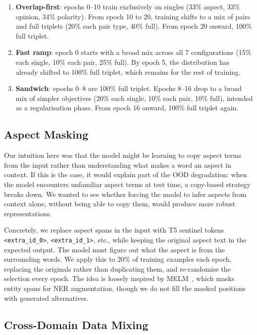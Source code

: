 \documentclass[12pt,a4paper]{report}
\begin{document}
\begin{enumerate}
    \item \textbf{Overlap-first}: epochs 0--10 train exclusively on singles (33\% aspect, 33\% opinion, 34\% polarity). From epoch 10 to 20, training shifts to a mix of pairs and full triplets (20\% each pair type, 40\% full). From epoch 20 onward, 100\% full triplet.
    \item \textbf{Fast ramp}: epoch 0 starts with a broad mix across all 7 configurations (15\% each single, 10\% each pair, 25\% full). By epoch 5, the distribution has already shifted to 100\% full triplet, which remains for the rest of training.
    \item \textbf{Sandwich}: epochs 0--8 are 100\% full triplet. Epochs 8--16 drop to a broad mix of simpler objectives (20\% each single, 10\% each pair, 10\% full), intended as a regularisation phase. From epoch 16 onward, 100\% full triplet again.
\end{enumerate}

\subsection{Aspect Masking}

Our intuition here was that the model might be learning to copy aspect terms from the input rather 
than understanding what makes a word an aspect in context. If this is the case, it would explain part 
of the OOD degradation: when the model encounters unfamiliar aspect terms at test time, 
a copy-based strategy breaks down. We wanted to see whether forcing the model to infer aspects 
from context alone, without being able to copy them, would produce more robust representations.

Concretely, we replace aspect spans in the input with T5 sentinel tokens \texttt{<extra\_id\_0>},
 \texttt{<extra\_id\_1>}, etc., while keeping the original aspect text in the expected output. 
 The model must figure out what the aspect is from the surrounding words. We apply this to 20\% of 
 training examples each epoch, replacing the originals rather than duplicating them, and re-randomise 
 the selection every epoch. The idea is loosely inspired by MELM~\cite{zhou2022melm}, which masks 
 entity spans for NER augmentation, though we do not fill the masked positions with generated alternatives.

\subsection{Cross-Domain Data Mixing}
\end{document}
